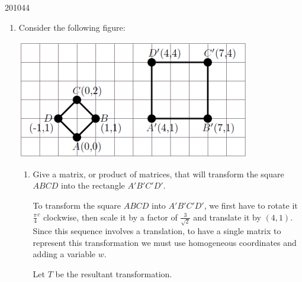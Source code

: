 \documentclass[10pt,\jkfside,a4paper]{article}
\begin{document}
\begin{enumerate}[label=(\alph*)]
\begin{examquestion}{2010}{4}{4}
\begin{enumerate}[label=(\alph*)]
\begin{enumerate}[label=(\roman*)]
\end{enumerate}

\item Consider the following figure:

\begin{center}
\includegraphics{gridwsquares}
\end{center}

\begin{enumerate}[label=(\roman*)]

\item Give a matrix, or product of matrices, that will transform the square $ABCD$ 
into the rectangle $A'B'C'D'$.

To transform the square $ABCD$ into $A'B'C'D'$, we first have to rotate it $\frac{\pi}{4}^c$ clockwise, 
then scale it by a factor of $\frac{3}{\sqrt{2}}$ and translate it by $(4, 1)$.
Since this sequence involves a translation, to have a single matrix to represent this transformation we must 
use homogeneous coordinates and adding a variable $w$.

Let $T$ be the resultant transformation.


\end{enumerate}
\end{enumerate}
\end{examquestion}
\end{enumerate}
\end{document}
